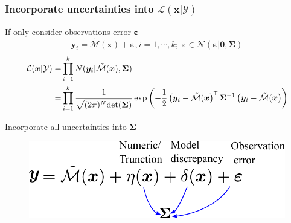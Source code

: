 \begin{frame}
\frametitle{Incorporate uncertainties into $\mathcal{L}(\boldsymbol{x}|\mathcal{Y})$}
    

\begin{block}{If only consider observations error $\boldsymbol{\varepsilon}$}
\begin{equation*}
\boldsymbol{y}_i = \tilde{\mathcal{M}}(\boldsymbol{x})
+ \boldsymbol{\varepsilon}, i=1,\cdots,k; \ \boldsymbol{\varepsilon} \in \mathcal{N}(\boldsymbol{\varepsilon}|\boldsymbol{0},\boldsymbol{\Sigma})
\end{equation*}
\begin{equation*}        
        \label{eq: Likelihood function}
\begin{aligned}
 \mathcal{L}(\boldsymbol{x}|\mathcal{Y}) =& \prod_{i=1}^{k} N(\boldsymbol{y}_i|\tilde{\mathcal{M}}(\boldsymbol{x}),\boldsymbol{\Sigma}) \\
 =& \prod_{i=1}^{k}\frac{1}{\sqrt{(2 \pi)^{N}{\rm{det}} 
 (\boldsymbol{\Sigma})}}\exp\left(-\frac{1}{2}\left(\boldsymbol{y}_i - \tilde{\mathcal{M}}(\boldsymbol{x}\right)^{\mathsf{T}} \boldsymbol{\Sigma}^{-1}\left(\boldsymbol{y}_i - \tilde{\mathcal{M}}(\boldsymbol{x}\right)\right)
\end{aligned}
        \end{equation*}  
\end{block}

\begin{alertblock}{Incorporate all uncertainties into $\boldsymbol{\Sigma}$}
\begin{figure}[!ht]       \includegraphics[scale=0.45]{figures/figure-CoVUncertainty.pdf}
\end{figure}
    
\end{alertblock}


\end{frame}
